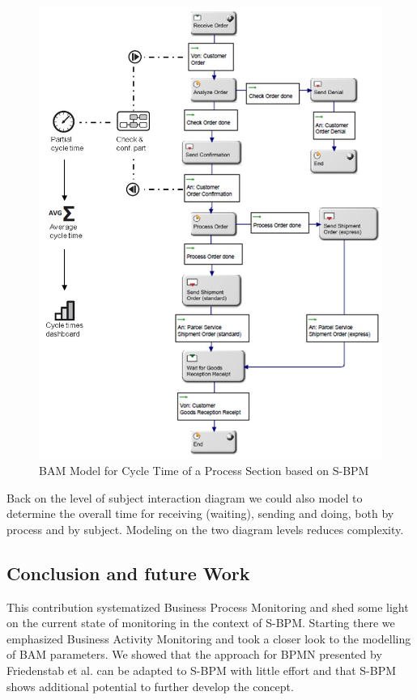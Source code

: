 \begin{figure}[htbp]
	\centering
	\includegraphics[width=0.9\linewidth]{Figures/Chapter5/Monitoring/BAM-Model-for-Cycle-Time-of-a-Process-Section-based-on-S-BPM.jpg}
	\caption[BAM Model for Cycle Time of a Process Section based on S-BPM]{BAM Model for Cycle Time of a Process Section based on S-BPM}
	\label{fig:BAM-Cycle-Time}
\end{figure}

Back on the level of subject interaction diagram we could also model to determine the overall time for receiving (waiting), sending and doing, both by process and by subject. Modeling on the two diagram levels reduces complexity.

\subsection {Conclusion and future Work}
This contribution systematized Business Process Monitoring and shed some light on the current state of monitoring in the context of S-BPM. Starting there we emphasized Business Activity Monitoring and took a closer look to the modelling of BAM parameters. We showed that the approach for BPMN presented by Friedenstab et al. can be adapted to S-BPM with little effort and that S-BPM shows additional potential to further develop the concept.
\\
